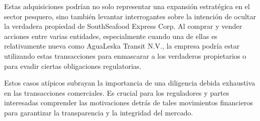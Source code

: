 \documentclass[11pt,spanish,a4paper]{article}
\begin{document}
Estas adquisiciones podrían no solo representar una expansión estratégica en el sector pesquero, sino también levantar interrogantes sobre la intención de ocultar la verdadera propiedad de SouthSeafood Express Corp. Al comprar y vender acciones entre varias entidades, especialmente cuando una de ellas es relativamente nueva como AguaLeska Transit N.V., la empresa podría estar utilizando estas transacciones para enmascarar a los verdaderos propietarios o para evadir ciertas obligaciones regulatorias.

Estos casos atípicos subrayan la importancia de una diligencia debida exhaustiva en las transacciones comerciales. Es crucial para los reguladores y partes interesadas comprender las motivaciones detrás de tales movimientos financieros para garantizar la transparencia y la integridad del mercado.

\printbibliography[heading=bibintoc] %
\end{document}
